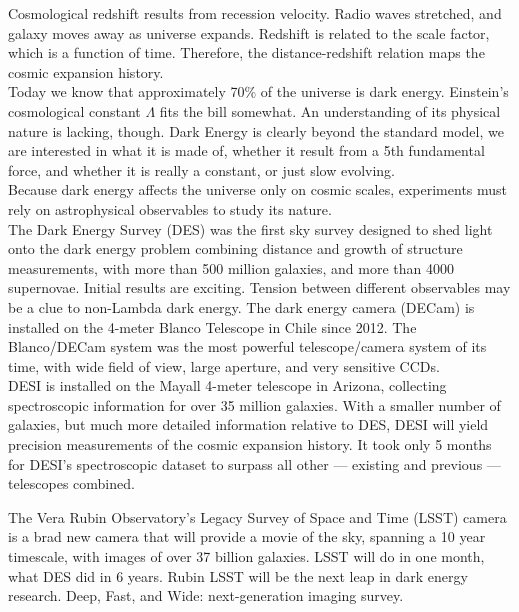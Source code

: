 \documentclass[11pt]{article}
\theoremstyle{break}
\theoremstyle{break}
\begin{document}
Cosmological redshift results from recession velocity. Radio waves stretched, and galaxy moves away as universe expands. Redshift is related to the scale factor, which is a function of time. Therefore, the distance-redshift relation maps the cosmic expansion history. \\

 Today we know that approximately 70$\%$ of the universe is dark energy. Einstein's cosmological constant $\Lambda$ fits the bill somewhat. An understanding of its physical nature is lacking, though. Dark Energy is clearly beyond the standard model, we are interested in what it is made of, whether it result from a 5th fundamental force, and whether it is really a constant, or just slow evolving.\\


Because dark energy affects the universe only on cosmic scales, experiments must rely on astrophysical observables to study its nature.\\

The Dark Energy Survey (DES) was the first sky survey designed to shed light onto the dark energy problem combining distance and growth of structure measurements, with more than 500 million galaxies, and more than 4000 supernovae. Initial results are exciting. Tension between different observables may be a clue to non-Lambda dark energy. The dark energy camera (DECam) is installed on the 4-meter Blanco Telescope in Chile since 2012. The Blanco/DECam system was the most powerful telescope/camera system of its time, with wide field of view, 
large aperture, and very sensitive CCDs. \\

DESI is installed on the Mayall 4-meter telescope in Arizona, collecting spectroscopic information for over 35 million galaxies. With a smaller number of galaxies, but much more detailed information relative to DES, DESI will yield precision measurements of the cosmic expansion history. It took only 5 months for DESI's spectroscopic dataset to surpass all other — existing and previous — telescopes combined.

The Vera Rubin Observatory's Legacy Survey of Space and Time (LSST) camera is a brad new camera that will provide a movie of the sky, spanning a 10 year timescale, with images of over 37 billion galaxies. LSST will do in one month, what DES did in 6 years. Rubin LSST will be the next leap in dark energy research. Deep, Fast, and Wide: next-generation imaging survey.\\
\end{document}
